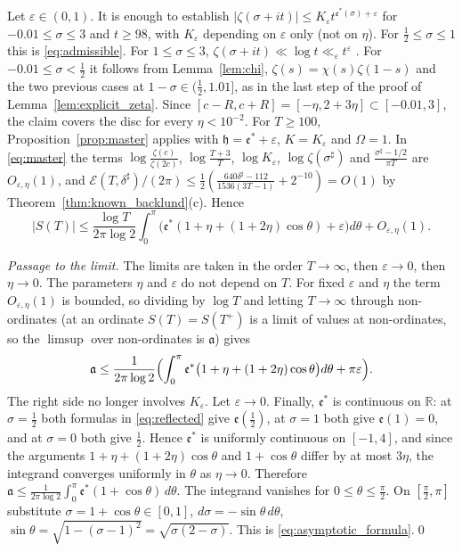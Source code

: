 \documentclass[11pt,a4paper]{article}
\makeatletter
\numberwithin{equation}{section}
\DeclareRobustCommand{\CGref}[1]{\ref{#1}}
\DeclareRobustCommand{\CGeqref}[1]{\eqref{#1}}
\DeclareRobustCommand{\CGcite}[2][]{\if\relax\detokenize{#1}\relax\cite{#2}\else\cite[#1]{#2}\fi}
\let\CG@origref\ref
\let\CG@origeqref\eqref
\newcommand{\CG@gettip}[1]{\@ifundefined{CGTip@#1}{#1}{\csname CGTip@#1\endcsname}}
\newcommand{\CG@getbib}[1]{\@ifundefined{CGBib@#1}{#1}{\csname CGBib@#1\endcsname}}
\DeclareRobustCommand{\CGref}[1]{\pdftooltip{\CG@origref{#1}}{\CG@gettip{#1}}}
\DeclareRobustCommand{\CGeqref}[1]{\pdftooltip{\CG@origeqref{#1}}{\CG@gettip{#1}}}
\DeclareRobustCommand{\CGcite}[2][]{\pdftooltip{\if\relax\detokenize{#1}\relax\cite{#2}\else\cite[#1]{#2}\fi}{\CG@getbib{#2}}}
\theoremstyle{definition}
\theoremstyle{remark}
\newcommand{\R}{\mathbb R}
\makeatother
\begin{document}
Let $\varepsilon\in(0,1)$. It is enough to establish $|\zeta(\sigma+it)|\le K_\varepsilon t^{\mathfrak e^*(\sigma)+\varepsilon}$ for $-0.01\le\sigma\le3$ and $t\ge98$, with $K_\varepsilon$ depending on $\varepsilon$ only (not on $\eta$). For $\frac12\le\sigma\le1$ this is \CGeqref{eq:admissible}. For $1\le\sigma\le3$, $\zeta(\sigma+it)\ll\log t\ll_\varepsilon t^\varepsilon$ \CGcite[Thm.~3.5]{Titchmarsh1986}. For $-0.01\le\sigma<\frac12$ it follows from Lemma~\CGref{lem:chi}, $\zeta(s)=\chi(s)\zeta(1-s)$ and the two previous cases at $1-\sigma\in(\frac12,1.01]$, as in the last step of the proof of Lemma~\CGref{lem:explicit_zeta}. Since $[c-R,c+R]=[-\eta,2+3\eta]\subset[-0.01,3]$, the claim covers the disc for every $\eta<10^{-2}$. For $T\ge100$, Proposition~\CGref{prop:master} applies with $\mathfrak h=\mathfrak e^*+\varepsilon$, $K=K_\varepsilon$ and $\Omega=1$. In \CGeqref{eq:master} the terms $\log\frac{\zeta(c)}{\zeta(2c)}$, $\log\frac{T+3}T$, $\log K_\varepsilon$, $\log\zeta(\sigma^\sharp)$ and $\frac{\sigma^\sharp-1/2}{\pi T}$ are $O_{\varepsilon,\eta}(1)$, and $\mathcal E(T,\delta^\sharp)/(2\pi)\le\frac12(\frac{640\delta^\sharp-112}{1536(3T-1)}+2^{-10})=O(1)$ by Theorem~\CGref{thm:known_backlund}(c). Hence
\begin{equation}
|S(T)|\le\frac{\log T}{2\pi\log2}\int_0^\pi\bigl(\mathfrak e^*(1+\eta+(1+2\eta)\cos\theta)+\varepsilon\bigr)d\theta+O_{\varepsilon,\eta}(1).
\label{eq:disp_15}
\end{equation}

\emph{Passage to the limit.} The limits are taken in the order $T\to\infty$, then $\varepsilon\to0$, then $\eta\to0$. The parameters $\eta$ and $\varepsilon$ do not depend on $T$. For fixed $\varepsilon$ and $\eta$ the term $O_{\varepsilon,\eta}(1)$ is bounded, so dividing by $\log T$ and letting $T\to\infty$ through non-ordinates (at an ordinate $S(T)=S(T^+)$ is a limit of values at non-ordinates, so the $\limsup$ over non-ordinates is $\mathfrak a$) gives
\begin{equation}
\mathfrak a\le\frac1{2\pi\log2}\Bigl(\int_0^\pi\mathfrak e^*\bigl(1+\eta+(1+2\eta)\cos\theta\bigr)d\theta+\pi\varepsilon\Bigr).
\label{eq:disp_16}
\end{equation}
The right side no longer involves $K_\varepsilon$. Let $\varepsilon\to0$. Finally, $\mathfrak e^*$ is continuous on $\R$: at $\sigma=\frac12$ both formulas in \CGeqref{eq:reflected} give $\mathfrak e(\frac12)$, at $\sigma=1$ both give $\mathfrak e(1)=0$, and at $\sigma=0$ both give $\frac12$. Hence $\mathfrak e^*$ is uniformly continuous on $[-1,4]$, and since the arguments $1+\eta+(1+2\eta)\cos\theta$ and $1+\cos\theta$ differ by at most $3\eta$, the integrand converges uniformly in $\theta$ as $\eta\to0$. Therefore $\mathfrak a\le\frac1{2\pi\log2}\int_0^\pi\mathfrak e^*(1+\cos\theta)\,d\theta$. The integrand vanishes for $0\le\theta\le\frac\pi2$. On $[\frac\pi2,\pi]$ substitute $\sigma=1+\cos\theta\in[0,1]$, $d\sigma=-\sin\theta\,d\theta$, $\sin\theta=\sqrt{1-(\sigma-1)^2}=\sqrt{\sigma(2-\sigma)}$. This is \CGeqref{eq:asymptotic_formula}.\qed
\end{document}
